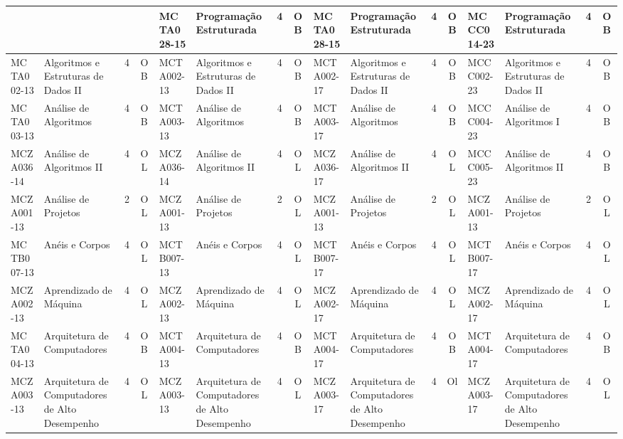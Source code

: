 \documentclass[a4paper]{article}
\begin{document}
\begin{landscape}
{\begin{longtable}{|l|p{.15\textheight}|c|c||l|p{.15\textheight}|c|c||l|p{.15\textheight}|c|c||l|p{.15\textheight}|c|c|}
    & & & &
    MCTA028-15 & Programação Estruturada & 4 & OB &
    MCTA028-15 & Programação Estruturada & 4 & OB &
    MCCC014-23 & Programação Estruturada & 4 & OB \\ \hline

    MCTA002-13 & Algoritmos e Estruturas de Dados II & 4 & OB &
    MCTA002-13 & Algoritmos e Estruturas de Dados II & 4 & OB &
    MCTA002-17 & Algoritmos e Estruturas de Dados II & 4 & OB &
    MCCC002-23 & Algoritmos e Estruturas de Dados II & 4 & OB \\ \hline

    MCTA003-13 & Análise de Algoritmos   & 4 & OB &
    MCTA003-13 & Análise de Algoritmos   & 4 & OB &
    MCTA003-17 & Análise de Algoritmos   & 4 & OB &
    MCCC004-23 & Análise de Algoritmos I & 4 & OB \\ \hline

    MCZA036-14 & Análise de Algoritmos II & 4 & OL &
    MCZA036-14 & Análise de Algoritmos II & 4 & OL &
    MCZA036-17 & Análise de Algoritmos II & 4 & OL &
    MCCC005-23 & Análise de Algoritmos II & 4 & OB  \\ \hline

    MCZA001-13 & Análise de Projetos & 2 & OL &
    MCZA001-13 & Análise de Projetos & 2 & OL &
    MCZA001-13 & Análise de Projetos & 2 & OL &
    MCZA001-13 & Análise de Projetos & 2 & OL\\ \hline

    MCTB007-13 & Anéis e Corpos & 4 & OL &
    MCTB007-13 & Anéis e Corpos & 4 & OL &
    MCTB007-17 & Anéis e Corpos & 4 & OL &
    MCTB007-17 & Anéis e Corpos & 4 & OL \\ \hline

    MCZA002-13 & Aprendizado de Máquina & 4 & OL &
    MCZA002-13 & Aprendizado de Máquina & 4 & OL &
    MCZA002-17 & Aprendizado de Máquina & 4 & OL &
    MCZA002-17 & Aprendizado de Máquina & 4 & OL\\ \hline

    MCTA004-13 & Arquitetura de Computadores & 4 & OB &
    MCTA004-13 & Arquitetura de Computadores & 4 & OB &
    MCTA004-17 & Arquitetura de Computadores & 4 & OB &
    MCTA004-17 & Arquitetura de Computadores & 4 & OB \\ \hline

    MCZA003-13 & Arquitetura de Computadores de Alto Desempenho & 4 & OL &
    MCZA003-13 & Arquitetura de Computadores de Alto Desempenho & 4 & OL &
    MCZA003-17 & Arquitetura de Computadores de Alto Desempenho & 4 & Ol &
    MCZA003-17 & Arquitetura de Computadores de Alto Desempenho & 4 & OL\\ \hline


\end{longtable}}
\end{landscape}
\end{document}
